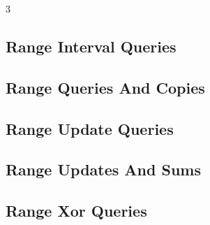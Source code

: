 \documentclass[8pt]{extarticle}
\begin{document}
\begin{multicols*}{3}
\subsection{Range Interval Queries}
\begin{caixaenunciado}

\end{caixaenunciado}
\vspace{0.3cm}


\subsection{Range Queries And Copies}
\begin{caixaenunciado}

\end{caixaenunciado}
\vspace{0.3cm}


\subsection{Range Update Queries}
\begin{caixaenunciado}

\end{caixaenunciado}
\vspace{0.3cm}


\subsection{Range Updates And Sums}
\begin{caixaenunciado}

\end{caixaenunciado}
\vspace{0.3cm}


\subsection{Range Xor Queries}
\begin{caixaenunciado}

\end{caixaenunciado}
\vspace{0.3cm}



\end{multicols*}
\end{document}
